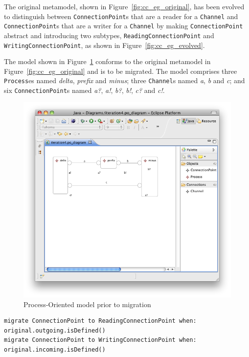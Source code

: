 The original metamodel, shown in Figure~\ref{fig:cc_eg_original}, has been evolved to distinguish between \texttt{Co\-nn\-ec\-ti\-o\-nP\-oi\-nt}s that are a reader for a \texttt{Ch\-an\-n\-el} and \texttt{Co\-nn\-ec\-ti\-o\-nP\-oi\-nt}s that are a writer for a \texttt{Ch\-an\-n\-el} by making \texttt{Co\-nn\-ec\-ti\-o\-nP\-oi\-nt} abstract and introducing two subtypes, \texttt{Re\-a\-di\-ngCo\-nn\-ec\-ti\-o\-nP\-oi\-nt} and \texttt{Wr\-i\-ti\-ngCo\-nn\-ec\-ti\-o\-nP\-oi\-nt}, as shown in Figure~\ref{fig:cc_eg_evolved}.

The model shown in Figure~\ref{fig:cc_eg_model} conforms to the original metamodel in Figure~\ref{fig:cc_eg_original} and is to be migrated. The model comprises three \texttt{Pr\-oc\-e\-ss}es named \emph{delta}, \emph{prefix} and \emph{minus}; three \texttt{Ch\-an\-n\-el}s named \emph{a}, \emph{b} and \emph{c}; and six \texttt{Co\-nn\-ec\-ti\-o\-nP\-oi\-nt}s named \emph{a?}, \emph{a!}, \emph{b?}, \emph{b!}, \emph{c?} and \emph{c!}.

\begin{figure}[htbp]
	\centering
		\includegraphics[scale=0.5]{A.2.ProcessOriented/images/4_model.png}
	\caption{Process-Oriented model prior to migration}
	\label{fig:cc_eg_model}
\end{figure}

\begin{lstlisting}[float=tbp, caption=Redefining equivalences for the Component model migration., label=lst:cc_eg_rules, language=Flock]
migrate ConnectionPoint to ReadingConnectionPoint when: original.outgoing.isDefined()
migrate ConnectionPoint to WritingConnectionPoint when: original.incoming.isDefined()
\end{lstlisting}

